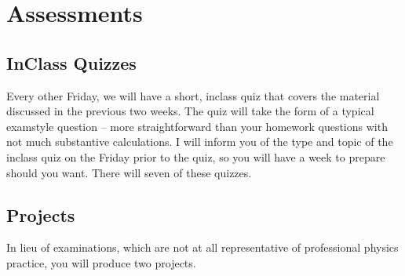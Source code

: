 \documentclass[letterpaper,10pt,english]{jupyterBook}
\begin{document}
\section{Assessments}
\label{\detokenize{content/0_course/assessments:assessments}}\label{\detokenize{content/0_course/assessments::doc}}

\subsection{In\sphinxhyphen{}Class Quizzes}
\label{\detokenize{content/0_course/assessments:in-class-quizzes}}
\sphinxAtStartPar
Every other Friday, we will have a short, in\sphinxhyphen{}class quiz that covers the material discussed in the previous two weeks. The quiz will take the form of a typical exam\sphinxhyphen{}style question – more straight\sphinxhyphen{}forward than your homework questions with not much substantive calculations. I will inform you of the type and topic of the in\sphinxhyphen{}class quiz on the Friday prior to the quiz, so you will have a week to prepare should you want. There will seven of these quizzes. 


\subsection{Projects}
\label{\detokenize{content/0_course/assessments:projects}}
\sphinxAtStartPar
In lieu of examinations, which are not at all representative of professional physics practice, you will produce two projects.
\end{document}
